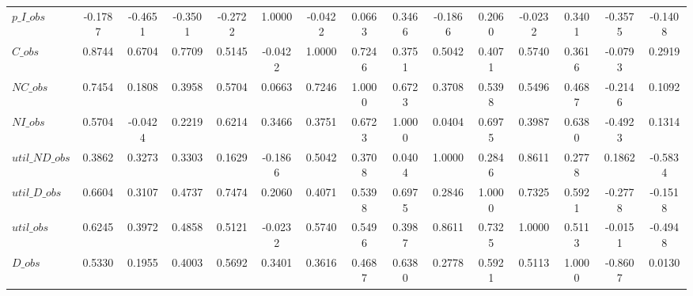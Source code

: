 \begin{center}
\begin{longtable}{lcccccccccccccc}
$p\_I\_obs      $	 & 	          -0.1787	 & 	          -0.4651	 & 	          -0.3501	 & 	          -0.2722	 & 	           1.0000	 & 	          -0.0422	 & 	           0.0663	 & 	           0.3466	 & 	          -0.1866	 & 	           0.2060	 & 	          -0.0232	 & 	           0.3401	 & 	          -0.3575	 & 	          -0.1408 \\ 
$C\_obs         $	 & 	           0.8744	 & 	           0.6704	 & 	           0.7709	 & 	           0.5145	 & 	          -0.0422	 & 	           1.0000	 & 	           0.7246	 & 	           0.3751	 & 	           0.5042	 & 	           0.4071	 & 	           0.5740	 & 	           0.3616	 & 	          -0.0793	 & 	           0.2919 \\ 
$NC\_obs        $	 & 	           0.7454	 & 	           0.1808	 & 	           0.3958	 & 	           0.5704	 & 	           0.0663	 & 	           0.7246	 & 	           1.0000	 & 	           0.6723	 & 	           0.3708	 & 	           0.5398	 & 	           0.5496	 & 	           0.4687	 & 	          -0.2146	 & 	           0.1092 \\ 
$NI\_obs        $	 & 	           0.5704	 & 	          -0.0424	 & 	           0.2219	 & 	           0.6214	 & 	           0.3466	 & 	           0.3751	 & 	           0.6723	 & 	           1.0000	 & 	           0.0404	 & 	           0.6975	 & 	           0.3987	 & 	           0.6380	 & 	          -0.4923	 & 	           0.1314 \\ 
$util\_ND\_obs  $	 & 	           0.3862	 & 	           0.3273	 & 	           0.3303	 & 	           0.1629	 & 	          -0.1866	 & 	           0.5042	 & 	           0.3708	 & 	           0.0404	 & 	           1.0000	 & 	           0.2846	 & 	           0.8611	 & 	           0.2778	 & 	           0.1862	 & 	          -0.5834 \\ 
$util\_D\_obs   $	 & 	           0.6604	 & 	           0.3107	 & 	           0.4737	 & 	           0.7474	 & 	           0.2060	 & 	           0.4071	 & 	           0.5398	 & 	           0.6975	 & 	           0.2846	 & 	           1.0000	 & 	           0.7325	 & 	           0.5921	 & 	          -0.2778	 & 	          -0.1518 \\ 
$util\_obs      $	 & 	           0.6245	 & 	           0.3972	 & 	           0.4858	 & 	           0.5121	 & 	          -0.0232	 & 	           0.5740	 & 	           0.5496	 & 	           0.3987	 & 	           0.8611	 & 	           0.7325	 & 	           1.0000	 & 	           0.5113	 & 	          -0.0151	 & 	          -0.4948 \\ 
$D\_obs         $	 & 	           0.5330	 & 	           0.1955	 & 	           0.4003	 & 	           0.5692	 & 	           0.3401	 & 	           0.3616	 & 	           0.4687	 & 	           0.6380	 & 	           0.2778	 & 	           0.5921	 & 	           0.5113	 & 	           1.0000	 & 	          -0.8607	 & 	           0.0130 \\ 

\end{longtable}
\end{center}

